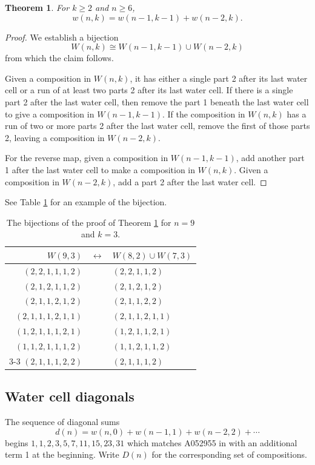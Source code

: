 \documentclass[]{interact}
\theoremstyle{plain}
\numberwithin{equation}{section} %
\newtheorem{theorem}[thm]{Theorem}
\numberwithin{table}{section} %
\numberwithin{figure}{section}
\begin{document}
\begin{theorem} \label{wc2}
For $k \ge 2$ and $n \ge 6$, \[w(n,k) = w(n-1,k-1) + w(n-2,k).\]
\end{theorem}

\begin{proof}
We establish a bijection
\[W(n,k) \cong W(n-1,k-1) \cup W(n-2,k)\]
from which the claim follows.

Given a composition in $W(n,k)$, it has either a single part 2 after its last water cell or a run of at least two parts 2 after its last water cell.  If there is a single part 2 after the last water cell, then remove the part 1 beneath the last water cell to give a composition in $W(n-1,k-1)$.  If the composition in $W(n,k)$ has a run of two or more parts 2 after the last water cell, remove the first of those parts 2, leaving a composition in $W(n-2,k)$.

For the reverse map, given a composition in $W(n-1,k-1)$, add another part 1 after the last water cell to make a composition in $W(n,k)$.  Given a composition in $W(n-2,k)$, add a part 2 after the last water cell.
\end{proof}

See Table \ref{wc2ex} for an example of the bijection.

\begin{table}[ht]
\caption{The bijections of the proof of Theorem \ref{wc2} for $n= 9$ and $k = 3$.} 
\medskip
\centering
\begin{tabular}{rcl}
$W(9,3)$ & $\longleftrightarrow$ & $W(8,2) \cup W(7,3)$ \\ \hline
$(2,2,1,1,1,2)$ & & $(2,2,1,1,2)$ \\
$(2,1,2,1,1,2)$ & & $(2,1,2,1,2)$ \\ 
$(2,1,1,2,1,2)$ & & $(2,1,1,2,2)$ \\
$(2,1,1,1,2,1,1)$ & & $(2,1,1,2,1,1)$ \\
$(1,2,1,1,1,2,1)$ & & $(1,2,1,1,2,1)$ \\ 
$(1,1,2,1,1,1,2)$ & & $(1,1,2,1,1,2)$  \\ \cline{3-3}
$(2,1,1,1,2,2)$ & & $(2,1,1,1,2)$
\end{tabular}
\label{wc2ex}
\end{table}


\subsection{Water cell diagonals}
The sequence of diagonal sums
\[d(n) = w(n,0) + w(n-1,1) + w(n-2,2) + \cdots\]
begins $1, 1, 2, 3, 5, 7, 11, 15, 23, 31$ which matches A052955 in \cite{o} with an additional term 1 at the beginning.  Write $D(n)$ for the corresponding set of compositions.
\end{document}
